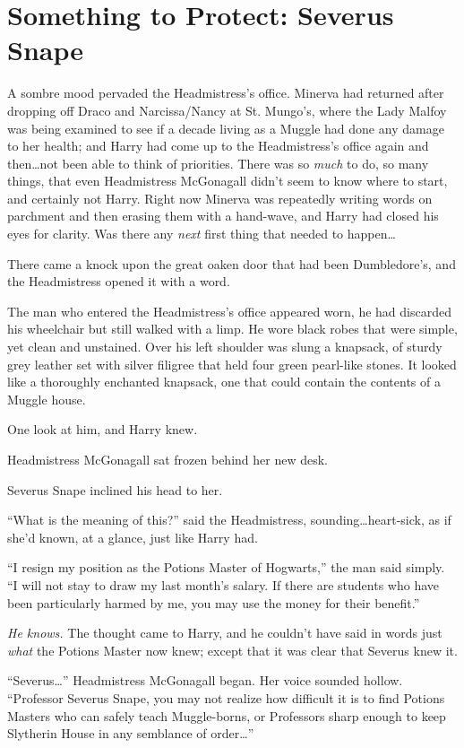 \chapter{Something to Protect: Severus Snape}

\lettrine{A}{} sombre mood pervaded the Headmistress’s office. Minerva had returned after dropping off Draco and Narcissa/Nancy at St. Mungo’s, where the Lady Malfoy was being examined to see if a decade living as a Muggle had done any damage to her health; and Harry had come up to the Headmistress’s office again and then…not been able to think of priorities. There was so \emph{much} to do, so many things, that even Headmistress McGonagall didn’t seem to know where to start, and certainly not Harry. Right now Minerva was repeatedly writing words on parchment and then erasing them with a hand-wave, and Harry had closed his eyes for clarity. Was there any \emph{next} first thing that needed to happen…

There came a knock upon the great oaken door that had been Dumbledore’s, and the Headmistress opened it with a word.

The man who entered the Headmistress’s office appeared worn, he had discarded his wheelchair but still walked with a limp. He wore black robes that were simple, yet clean and unstained. Over his left shoulder was slung a knapsack, of sturdy grey leather set with silver filigree that held four green pearl-like stones. It looked like a thoroughly enchanted knapsack, one that could contain the contents of a Muggle house.

One look at him, and Harry knew.

Headmistress McGonagall sat frozen behind her new desk.

Severus Snape inclined his head to her.

“What is the meaning of this?” said the Headmistress, sounding…heart-sick, as if she’d known, at a glance, just like Harry had.

“I resign my position as the Potions Master of Hogwarts,” the man said simply.
“I will not stay to draw my last month’s salary. If there are students who have been particularly harmed by me, you may use the money for their benefit.”

\emph{He knows.} The thought came to Harry, and he couldn’t have said in words just \emph{what} the Potions Master now knew; except that it was clear that Severus knew it.

“Severus…” Headmistress McGonagall began. Her voice sounded hollow.
“Professor Severus Snape, you may not realize how difficult it is to find Potions Masters who can safely teach Muggle-borns, or Professors sharp enough to keep Slytherin House in any semblance of order…”

